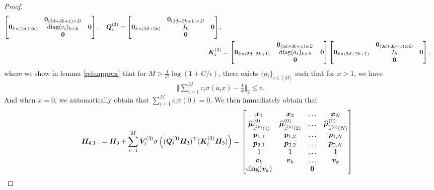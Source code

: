 \begin{proof}
\begin{align*}
\begin{bmatrix}
        &\boldsymbol{0}_{(3d+3k+1)\times D}&\\
        \boldsymbol{0}_{k\times(2d+2k)}&\text{diag}(c_i)_{k\times k}&\boldsymbol{0}\\
        &\boldsymbol{0}&
    \end{bmatrix},\quad\boldsymbol{Q}_{i}^{(3)}=\begin{bmatrix}
        &\boldsymbol{0}_{(3d+3k+1)\times D}&\\
        \boldsymbol{0}_{k\times(2d+2k)} &I_{k}&\boldsymbol{0}\\
        &\boldsymbol{0}&
    \end{bmatrix},\\
    \boldsymbol{K}_{i}^{(3)}&=\begin{bmatrix}
        &\boldsymbol{0}_{(3d+3k+1)\times D}&\\
        \boldsymbol{0}_{k \times (3d+3k+1)}&\text{diag}(a_i)_{k\times k}&\boldsymbol{0}\\
        &\boldsymbol{0}&
    \end{bmatrix}\begin{bmatrix}
        &\boldsymbol{0}_{(3d+3k+1)\times D}&\\
       \boldsymbol{0}_{k\times(3d+2k+1)}&I_{k} &\boldsymbol{0}\\
       &\boldsymbol{0}&
    \end{bmatrix},
\end{align*}
where we show in lemma \ref{reluapprox} that for $M>\frac{1}{\epsilon^2}\log(1+C/\epsilon)$, there exists $\{a_i\}_{i\in[M]}$ such that for $x>1$, we have 
\begin{align*}
    \bigg\Vert\sum_{i=1}^Mc_i\sigma(a_ix) - \frac{1}{x}\bigg\Vert_2\leq\epsilon.
\end{align*}
And when $x=0$, we automatically obtain that 
$   \sum_{i=1}^Mc_i\sigma(0) =0$. We then immediately obtain that
\begin{align*}
    \boldsymbol{H}_{4,1}:&=\boldsymbol{H}_3 + \sum_{i=1}^M\boldsymbol{V}_i^{(3)}\sigma\left((\boldsymbol{Q}_i^{(3)}\boldsymbol{H}_3)^\top(\boldsymbol{K}_i^{(3)}\boldsymbol{H}_3)\right)= \begin{bmatrix}
        \boldsymbol{x}_1&\boldsymbol{x}_2&\ldots&\boldsymbol{x}_N\\
        \widehat{\boldsymbol{\mu}}_{\widehat{z}^{(0)}(1)}^{(0)}&\widehat{\boldsymbol{\mu}}_{\widehat{z}^{(0)}(2)}^{(0)}&\ldots&\widehat{\boldsymbol{\mu}}_{\widehat{z}^{(0)}(N)}^{(0)}\\
        \boldsymbol{p}_{1,1}&\boldsymbol{p}_{1,2}&\ldots&\boldsymbol{p}_{1,N}\\
        \boldsymbol{p}_{2,1}&\boldsymbol{p}_{2,2}&\ldots&\boldsymbol{p}_{2,N}\\
        1&1&\ldots&1\\
        \boldsymbol{v}_k&\boldsymbol{v}_k&\ldots&\boldsymbol{v}_k\\
        \text{diag}(\boldsymbol{v}_k)&&\boldsymbol{0}&\\

\end{bmatrix}
\end{align*}
\end{proof}
